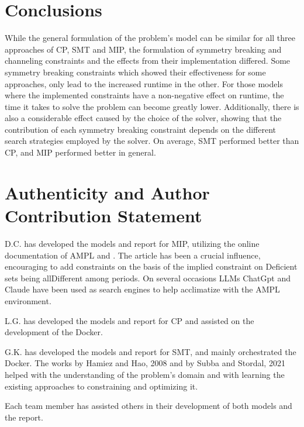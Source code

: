 \documentclass{article}
\begin{document}
\section{Conclusions}
While the general formulation of the problem's model can be similar for all three approaches of CP, SMT and MIP, the formulation of symmetry breaking and channeling constraints and the effects from their implementation differed. Some symmetry breaking constraints which showed their effectiveness for some approaches, only lead to the increased runtime in the other.
For those models where the implemented constraints have a non-negative effect on runtime, the time it takes to solve the problem can become greatly lower.
Additionally, there is also a considerable effect caused by the choice of the solver, showing that the contribution of each symmetry breaking constraint depends on the different search strategies employed by the solver.
On average, SMT performed better than CP, and MIP performed better in general.


\section*{Authenticity and Author Contribution Statement}
D.C. has developed the models and report for MIP, utilizing the online documentation of AMPL and  \cite{amplbook}. The article \cite{hamiez2008using} has been a crucial influence, encouraging to add constraints on the basis of the implied constraint on Deficient sets being allDifferent among periods.  On several occasions LLMs ChatGpt and Claude have been used as search engines to help acclimatize with the AMPL environment. 

L.G. has developed the models and report for CP and assisted on the development of the Docker. 


G.K. has developed the models and report for SMT, and mainly orchestrated the Docker. The works by Hamiez and Hao, 2008\cite{hamiez2008using} and by Subba and Stordal, 2021\cite{SubbaStordal2021} helped with the understanding of the problem's domain and with learning the existing approaches to constraining and optimizing it.

Each team member has assisted others in their development of both models and the report. 




\end{document}

